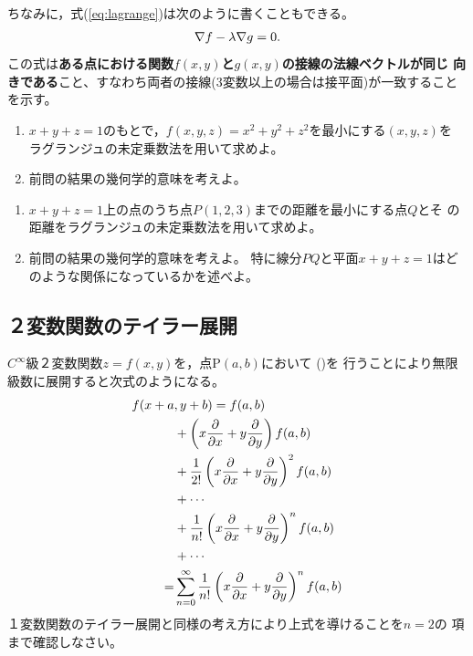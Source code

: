 \documentclass[twocolumn,11pt]{jarticle}
\begin{document}
ちなみに，式(\ref{eq:lagrange})は次のように書くこともできる。
\begin{align}
\nabla f -\lambda \nabla g=0\notag.
\end{align}
この式は\textbf{ある点における関数$f(x,y)$と$g(x,y)$の接線の法線ベクトルが同じ
向きである}こと、すなわち両者の接線(3変数以上の場合は接平面)が一致することを示す。


\nquestion
\begin{enumerate}
\item $x+y+z=1$のもとで，$f(x,y,z)=x^2+y^2+z^2$を最小にする$(x,y,z)$を
  ラグランジュの未定乗数法を用いて求めよ。
\item 前問の結果の幾何学的意味を考えよ。
\end{enumerate}
\nquestion
\begin{enumerate}
\item $x+y+z=1$上の点のうち点$P(1,2,3)$までの距離を最小にする点$Q$とそ
  の距離をラグランジュの未定乗数法を用いて求めよ。
\item 前問の結果の幾何学的意味を考えよ。
  特に線分$PQ$と平面$x+y+z=1$はどのような関係になっているかを述べよ。
\end{enumerate}
% 

\subsection{２変数関数のテイラー展開}
$C^{\infty}$級２変数関数$z=f(x,y)$を，点P$(a,b)$において
()を
行うことにより無限級数に展開すると次式のようになる。 
\begin{align}
  f(x+a&,y+b)
  =f(a,b)\notag\\
  &+\left(x\frac{\partial}{\partial x}+y\frac{\partial}{\partial y}\right)f(a,b) \notag\\
  &+\frac{1}{2!}\left(x\frac{\partial}{\partial x}+y\frac{\partial}{\partial y}\right)^2f(a,b) \notag\\
  &+\cdots \notag\\
  &+\frac{1}{n!}\left(x\frac{\partial}{\partial x}+y\frac{\partial}{\partial y}\right)^nf(a,b) \notag\\
  &+\cdots \notag\\
  =&\sum_{n=0}^{\infty}
   \frac{1}{n!}\left(x\frac{\partial}{\partial x}+y\frac{\partial}{\partial y}\right)^{n}f(a,b)
 \notag
\end{align}
\question
１変数関数のテイラー展開と同様の考え方により上式を導けることを$n=2$の
項まで確認しなさい。
\end{document}
